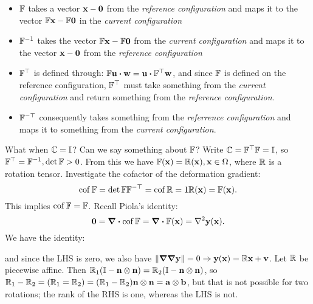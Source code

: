 \documentclass[reqno, a4paper]{article}
\begin{document}
\begin{itemize}
	\item $\mathbb{F}$ takes a vector $\vb{x}-\vb{0}$ from the \textit{reference configuration} and maps it to the vector $\mathbb{F} \vb{x}- \mathbb{F} \vb{0}$ in the \textit{current configuration}
	\item $\mathbb{F}^{-1}$ takes the vector $\mathbb{F} \vb{x} - \mathbb{F} \vb{0}$ from the \textit{current configuration} and maps it to the vector $\vb{x}-\vb{0}$ from the \textit{reference configuration}
	\item $\mathbb{F}^\top$ is defined through: $\fgrad \vb{u} \vdot \vb{w} = \vb{u} \vdot \transpose{\fgrad}\vb{w}$, and since $\mathbb{F}$ is defined on the reference configuration, $\mathbb{F}^\top$ must take something from the \textit{current configuration} and return something from the \textit{reference configuration}.
	\item $\mathbb{F}^{-\top}$ consequently takes something from the \textit{referrence configuration} and maps it to something from the \textit{current configuration}.
\end{itemize}	
\begin{example}
	What when $\mathbb{C} = \mathbb{I}$? Can we say something about $\mathbb{F}$? Write $\mathbb{C} = \mathbb{F}^\top\mathbb{F} = \mathbb{I}$, so $\mathbb{F}^\top = \mathbb{F}^{-1}, \det \mathbb{F} > 0$. From this we have $\mathbb{F}(\vb{x}) = \mathbb{R}(\vb{x}), \vb{x} \in \Omega$, where $\mathbb{R}$ is a rotation tensor. Investigate the cofactor of the deformation gradient:
	\[
		\operatorname{cof} \mathbb{F} = \det \mathbb{F} \mathbb{F}^{-\top} = \operatorname{cof} \mathbb{R} = 1 \mathbb{R}(\vb{x}) = \mathbb{F} (\vb{x}).
	\]
This implies $\operatorname{cof} \mathbb{F} = \mathbb{F}$. Recall Piola's identity:
\[
	\vb{0} = \divergence{\cof \fgrad} = \divergence{\fgrad (\vb{x})} = \laplacian \vb{y}(\vb{x}).
\]
We have the identity:
\begin{comment}
\begin{equation}
	\frac{1}{2}(\norm{\grad{\vb{y}})^{2} = \norm{\grad \grad \vb{y}}^{2} + \grad{\vb{y}} \vdot \grad \laplacian \vb{y},
\end{equation}
\end{comment}
and since the LHS is zero, we also have $\norm{\grad \grad \vb{y}} = 0 \Rightarrow \vb{y}(\vb{x}) = \mathbb{R}\vb{x}+\vb{v}$.
Let $\mathbb{R}$ be piecewise affine. Then $\mathbb{R}_1 (\mathbb{I} - \vb{n} \otimes \vb{n}) = \mathbb{R}_2(\mathbb{I} - \vb{n}\otimes \vb{n})$, so $\mathbb{R}_1 - \mathbb{R}_2 = (\mathbb{R}_1 = \mathbb{R}_2) = (\mathbb{R}_1 - \mathbb{R}_2) \vb{n} \otimes \vb{n} = \vb{a} \otimes \vb{b}$, but that is not possible for two rotations; the rank of the RHS is one, whereas the LHS is not.
\end{example}
\end{document}
